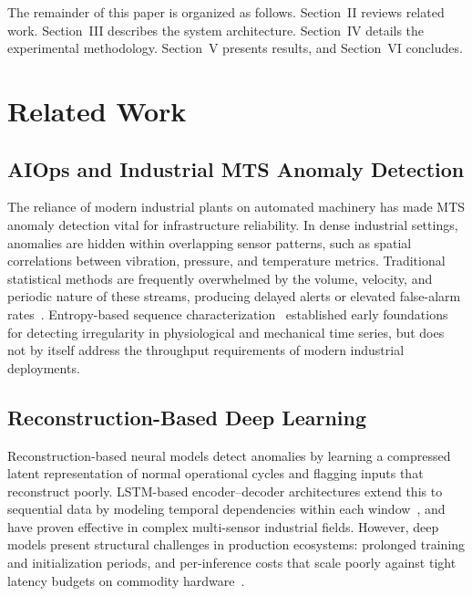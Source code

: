 The remainder of this paper is organized as follows. Section~II reviews
related work. Section~III describes the system architecture.
Section~IV details the experimental methodology. Section~V presents
results, and Section~VI concludes.

\section{Related Work}

\subsection{AIOps and Industrial MTS Anomaly Detection}
The reliance of modern industrial plants on automated machinery has made MTS
anomaly detection vital for infrastructure reliability. In dense industrial
settings, anomalies are hidden within overlapping sensor patterns, such as
spatial correlations between vibration, pressure, and temperature metrics.
Traditional statistical methods are frequently overwhelmed by the volume,
velocity, and periodic nature of these streams, producing delayed alerts or
elevated false-alarm rates~\cite{tao2025realtime, exarchos2021anomaly}.
Entropy-based sequence characterization~\cite{richman2000physiological}
established early foundations for detecting irregularity in physiological
and mechanical time series, but does not by itself address the throughput
requirements of modern industrial deployments.

\subsection{Reconstruction-Based Deep Learning}
Reconstruction-based neural models detect anomalies by learning a
compressed latent representation of normal operational cycles and flagging
inputs that reconstruct poorly. LSTM-based encoder--decoder architectures
extend this to sequential data by modeling temporal dependencies within
each window~\cite{malhotra2015lstm}, and have proven effective in complex
multi-sensor industrial fields. However, deep models present structural
challenges in production ecosystems: prolonged training and initialization
periods, and per-inference costs that scale poorly against tight latency
budgets on commodity hardware~\cite{exarchos2021anomaly}.

